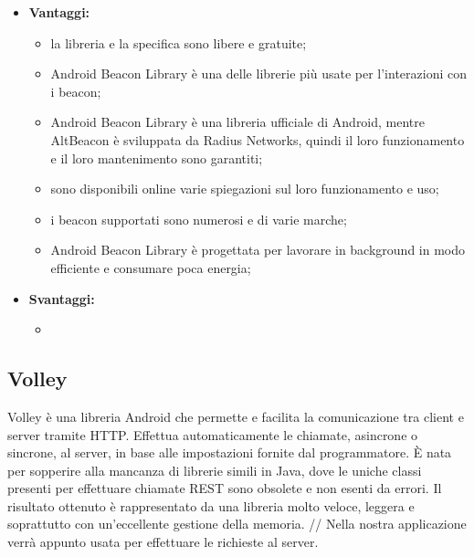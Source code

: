 	\begin{itemize} %
		\item \textbf{Vantaggi:}
			\begin{itemize}
				\item la libreria e la specifica sono libere e gratuite;
				\item Android Beacon Library è una delle librerie più usate per l'interazioni con i beacon;
				\item Android Beacon Library è una libreria ufficiale di Android, mentre AltBeacon è sviluppata da Radius Networks, quindi il loro funzionamento e il loro mantenimento sono garantiti;
				\item sono disponibili online varie spiegazioni sul loro funzionamento e uso;
				\item i beacon supportati sono numerosi e di varie marche;
				\item Android Beacon Library è progettata per lavorare in background in modo efficiente e consumare poca energia;
			\end{itemize}
		\item \textbf{Svantaggi:}
			\begin{itemize}
				\item
			\end{itemize}
	\end{itemize}
		
\subsection{Volley}

	Volley è una libreria Android che permette e facilita la comunicazione tra client e server tramite HTTP. Effettua automaticamente le chiamate, asincrone o sincrone, al server, in base alle impostazioni fornite dal programmatore. È nata per sopperire alla mancanza di librerie simili in Java, dove le uniche classi presenti per effettuare chiamate REST sono obsolete e non esenti da errori. Il risultato ottenuto è rappresentato da una libreria molto veloce, leggera e soprattutto con un'eccellente gestione della memoria. //
	Nella nostra applicazione verrà appunto usata per effettuare le richieste al server.

